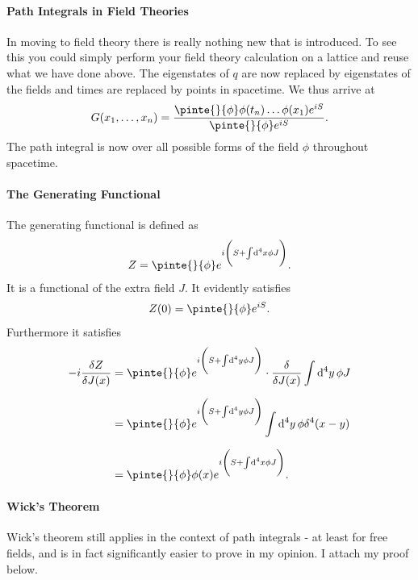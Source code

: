 \paragraph{Path Integrals in Field Theories}
In moving to field theory there is really nothing new that is introduced. To see this you could simply perform your field theory calculation on a lattice and reuse what we have done above. The eigenstates of $q$ are now replaced by eigenstates of the fields and times are replaced by points in spacetime. We thus arrive at
\begin{align*}
	G(x_{1}, \dots, x_{n}) = \frac{\pinte{}{\phi}\phi(t_{n})\dots \phi(x_{1})e^{iS}}{\pinte{}{\phi}e^{iS}}.
\end{align*}
The path integral is now over all possible forms of the field $\phi$ throughout spacetime.

\paragraph{The Generating Functional}
The generating functional is defined as
\begin{align*}
	Z = \pinte{}{\phi}e^{i\left(S + \inte{}{}\dd[4]{x}\phi J\right)}.
\end{align*}
It is a functional of the extra field $J$. It evidently satisfies
\begin{align*}
	Z(0) = \pinte{}{\phi}e^{iS}.
\end{align*}
Furthermore it satisfies
\begin{align*}
	-i\fdv{Z}{J(x)} &= \pinte{}{\phi}e^{i\left(S + \inte{}{}\dd[4]{y}\phi J\right)}\cdot\fdv{J(x)}\inte{}{}\dd[4]{y}\phi J \\
	                &= \pinte{}{\phi}e^{i\left(S + \inte{}{}\dd[4]{y}\phi J\right)}\inte{}{}\dd[4]{y}\phi\delta^{4}(x - y) \\
	                &= \pinte{}{\phi}\phi(x)e^{i\left(S + \inte{}{}\dd[4]{x}\phi J\right)}.
\end{align*}

\paragraph{Wick's Theorem}
Wick's theorem still applies in the context of path integrals - at least for free fields, and is in fact significantly easier to prove in my opinion. I attach my proof below.

